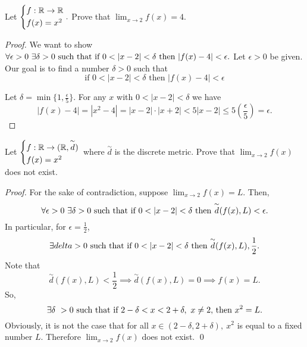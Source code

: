 \begin{example}
    Let $\begin{cases*}
        f: \R \to \R \\ f(x) = x^2
    \end{cases*}.$ Prove that $\lim_{x \to 2}f(x) = 4.$
\end{example}
\begin{proof}
    We want to show $\forall \epsilon > 0 ~\exists \delta > 0 \text{ such that } \text{if $0 < |x-2| < \delta$ then $|f(x) -4| < \epsilon$.}$ Let $\epsilon > 0$ be given. Our goal is to find a number $\delta > 0$ such that
    \begin{equation*}
        \text{if $0 < |x-2| < \delta$ then $|f(x) - 4| < \epsilon$} \tag{$*$}
    \end{equation*}
    Let $\delta = \min \{1, \frac{\epsilon}{5}\}.$ For any $x$ with $0<|x-2|<\delta$ we have 
    $$|f(x) - 4| = |x^2 - 4| = |x-2| \cdot |x+2| < 5 |x-2| \leq 5\left(\frac{\epsilon}{5}\right) = \epsilon.$$
\end{proof}

\begin{example}
    Let $\begin{cases*}
        f: \R \to (\R, \overset{\sim}{d}) \\ f(x) = x^2
    \end{cases*}$ where $\overset{\sim}{d}$ is the discrete metric. Prove that $\lim_{x \to 2}f(x)$ does not exist.
\end{example}
\begin{proof}
    For the sake of contradiction, suppose $\lim_{x \to 2}f(x) = L.$ Then,
    $$\forall \epsilon > 0 ~\exists \delta > 0 \st \text{if $0<|x-2|<\delta$ then $\overset{\sim}{d}(f(x),L)<\epsilon.$}$$
    In particular, for $\epsilon = \frac{1}{2}$,
    $$\exists delta > 0 \text{ such that } \text{if $0 < |x-2| < \delta$ then $\overset{\sim}{d}(f(x), L) , \frac{1}{2}$.}$$
    Note that
    $$\overset{\sim}{d}(f(x), L) < \frac{1}{2} \implies \overset{\sim}{d}(f(x), L) = 0 \implies f(x) = L.$$
    So,
    $$\exists \delta\ > 0 \text{ such that } \text{if $2-\delta < x < 2 + \delta, ~x \not = 2,$ then $x^2 = L.$}$$
    Obviously, it is not the case that for all $x\in (2-\delta, 2+\delta), ~x^2$ is equal to a fixed number $L$. Therefore $\lim_{x\to 2}f(x)$ does not exist. \qed
\end{proof}

